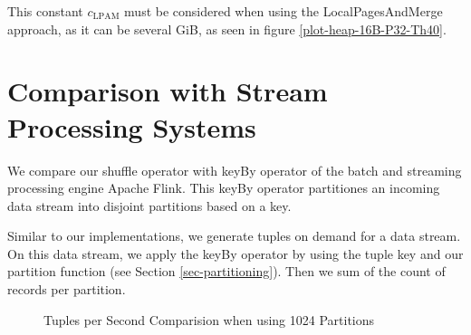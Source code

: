 This constant $c_\textrm{LPAM}$ must be considered when using the LocalPagesAndMerge approach, as it can be several GiB, as seen in figure \ref{plot-heap-16B-P32-Th40}.
\section{Comparison with Stream Processing Systems}
We compare our shuffle operator with keyBy operator of the batch and streaming processing engine Apache Flink\cite{apache-flink}.
This keyBy operator partitiones an incoming data stream into disjoint partitions based on a key.

Similar to our implementations, we generate tuples on demand for a data stream.
On this data stream, we apply the keyBy operator by using the tuple key and our partition function (see Section \ref{sec-partitioning}).
Then we sum of the count of records per partition.
\begin{figure}[h]
  \centering
  \resizebox{.75\linewidth}{!}{}
  \caption{Tuples per Second Comparision when using 1024 Partitions}
  \label{plot-apache-flink-comparison}
\end{figure}

